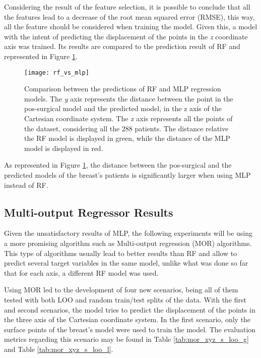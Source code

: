 Considering the result of the feature selection, it is possible to conclude that all the features lead to a decrease of the root mean squared error (RMSE), this way, all the feature should be considered when training the model. Given this, a model with the intent of predicting the displacement of the points in the \textit{z} coordinate axis was trained. Its results are compared to the prediction result of RF and represented in Figure \ref{fig:rf_vs_mlp}.

\begin{figure}[!htb]
\begin{center}
	\leavevmode
	\texttt{[image: rf\_vs\_mlp]}
	\caption[Comparison between the predictions of RF and MLP regression models.]{Comparison between the predictions of RF and MLP regression models. The \textit{y} axis represents the distance between the point in the pos-surgical model and the predicted model, in the z axis of the Cartesian coordinate system. The \textit{x} axis represents all the points of the dataset, considering all the 288 patients. The distance relative the RF model is displayed in green, while the distance of the MLP model is displayed in red.}
	\label{fig:rf_vs_mlp}
\end{center}
\end{figure}

As represented in Figure \ref{fig:rf_vs_mlp}, the distance between the pos-surgical and the predicted models of the breast's patients is significantly larger when using MLP instead of RF. 


\subsection{Multi-output Regressor Results} \label{subsec:mor_results}

Given the unsatisfactory results of MLP, the following experiments will be using a more promising algorithm such as Multi-output regression (MOR) algorithms. This type of algorithms usually lead to better results than RF and allow to predict several target variables in the same model, unlike what was done so far that for each axis, a different RF model was used.

Using MOR led to the development of four new scenarios, being all of them tested with both LOO and random train/test splits of the data. With the first and second scenarios, the model tries to predict the displacement of the points in the three axis of the Cartesian coordinate system. In the first scenario, only the surface points of the breast's model were used to train the model. The evaluation metrics regarding this scenario may be found in Table \ref{tab:mor_xyz_s_loo_g} and Table \ref{tab:mor_xyz_s_loo_l}. 

